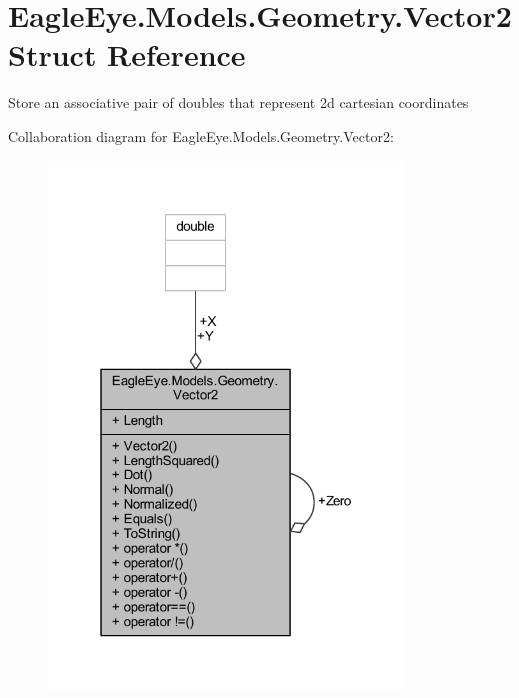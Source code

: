 \hypertarget{struct_eagle_eye_1_1_models_1_1_geometry_1_1_vector2}{}\section{Eagle\+Eye.\+Models.\+Geometry.\+Vector2 Struct Reference}
\label{struct_eagle_eye_1_1_models_1_1_geometry_1_1_vector2}


Store an associative pair of doubles that represent 2d cartesian coordinates  




Collaboration diagram for Eagle\+Eye.\+Models.\+Geometry.\+Vector2\+:
\nopagebreak
\begin{figure}[H]
\begin{center}
\leavevmode
\includegraphics[width=268pt]{struct_eagle_eye_1_1_models_1_1_geometry_1_1_vector2__coll__graph}
\end{center}
\end{figure}
